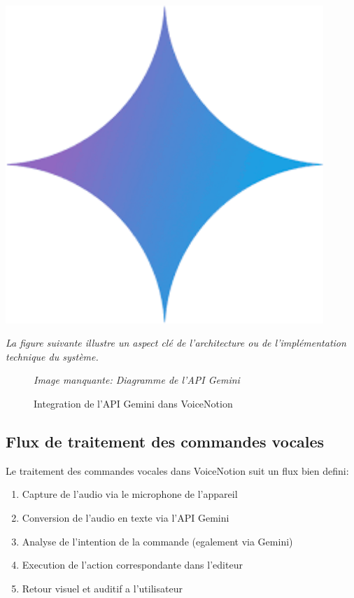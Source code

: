 \begin{minipage}{0.25\textwidth}
\centering
\includegraphics[width=0.9\textwidth]{assets/docs/gemini.png}
\end{minipage}

\noindent
\textit{La figure suivante illustre un aspect clé de l'architecture ou de l'implémentation technique du système.}
\begin{figure}[H]
\centering
\textit{Image manquante: Diagramme de l'API Gemini}
\caption{Integration de l'API Gemini dans VoiceNotion}
\label{fig:gemini-api}
\end{figure}

\subsection{Flux de traitement des commandes vocales}
Le traitement des commandes vocales dans VoiceNotion suit un flux bien defini:
\begin{enumerate}
    \item Capture de l'audio via le microphone de l'appareil
    \item Conversion de l'audio en texte via l'API Gemini
    \item Analyse de l'intention de la commande (egalement via Gemini)
    \item Execution de l'action correspondante dans l'editeur
    \item Retour visuel et auditif a l'utilisateur
\end{enumerate}

